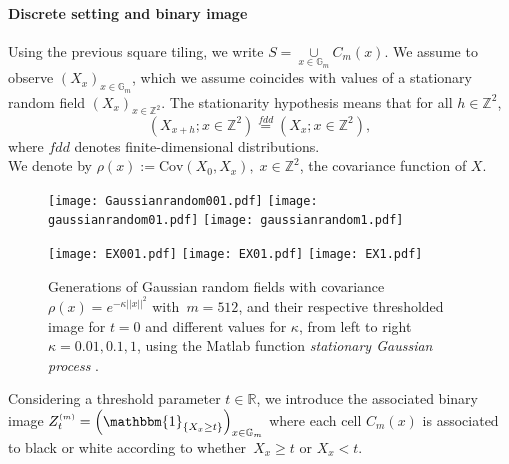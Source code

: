 \documentclass[12pt]{article}
\theoremstyle{Theorem}
\theoremstyle{definition}
\begin{document}
\paragraph{Discrete setting and binary image}
Using the previous square tiling, we write $S =  \underset{x \in \mathbb{G}_{m}}{\cup}  C_{m}(x)$. We assume to observe $\left(X_{\scriptscriptstyle x}\right)_{x \in \mathbb{G}_{m}}$, which we assume coincides with values of a stationary random field $\left(X_{\scriptscriptstyle x}\right)_{x \in \mathbb{Z}^{2}}$. The stationarity hypothesis means that for all $h \in \mathbb{Z}^{2}$, 
$$\left(X_{x+h}; x \in \mathbb{Z}^{2} \right)\overset{fdd}{=} \left(X_{\scriptscriptstyle x}; x \in \mathbb{Z}^{2} \right),$$ where $fdd$ denotes finite-dimensional distributions. \\
We denote by $\rho(x) :=\text{Cov}\left(X_{\scriptscriptstyle 0}, X_{\scriptscriptstyle x}\right), \; x \in \mathbb{Z}^{2}$, the covariance function of $X$.
\vspace{-2cm}
\begin{figure}[H]
{\texttt{[image: Gaussianrandom001.pdf]}}
{\texttt{[image: gaussianrandom01.pdf]}}
{\texttt{[image: gaussianrandom1.pdf]}}
\end{figure}
\vspace{-5cm}
\begin{figure}[H]
{\texttt{[image: EX001.pdf]}}
{\texttt{[image: EX01.pdf]}}
{\texttt{[image: EX1.pdf]}}
\vspace{-2cm}
 \caption{Generations of Gaussian random fields with covariance $\rho(x) = e^{-\kappa||x||^{2}}$ with~$m = 512$, and their respective thresholded image for $t=0$ and different values for $\kappa$, from left to right $\kappa = 0.01, 0.1, 1$, using the Matlab function \textit{stationary Gaussian process} \cite{MATLAB}.}
\label{fig22}
\end{figure}
Considering a threshold parameter $t \in \mathbb{R}$, we introduce the associated binary \linebreak image $Z^{\scriptscriptstyle (m)}_{t} = \left(\mathbbm{1}_{\left\{X_x \geq t\right\}} \right)_{x \in \mathbb{G}_{m}}$ where each cell $C_{m}(x)$ is associated to black or white according to whether~$X_{x} \geq t$ or $X_{x} < t$. 
\end{document}
